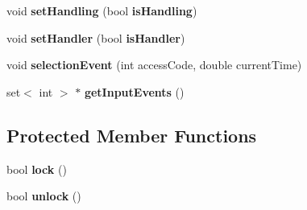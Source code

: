 \begin{CompactItemize}
\item 
void \textbf{setHandling} (bool {\bf isHandling})\label{classbr_1_1pucrio_1_1telemidia_1_1ginga_1_1ncl_1_1model_1_1components_1_1ExecutionObject_3fcfe4cd0c6be080a257bca297055e7c}

\item 
void \textbf{setHandler} (bool {\bf isHandler})\label{classbr_1_1pucrio_1_1telemidia_1_1ginga_1_1ncl_1_1model_1_1components_1_1ExecutionObject_270bb2b23cd33c6c981766852f74d99e}

\item 
void \textbf{selectionEvent} (int accessCode, double currentTime)\label{classbr_1_1pucrio_1_1telemidia_1_1ginga_1_1ncl_1_1model_1_1components_1_1ExecutionObject_1c356204c04e76d466c496ee81d7a04c}

\item 
set$<$ int $>$ $\ast$ \textbf{getInputEvents} ()\label{classbr_1_1pucrio_1_1telemidia_1_1ginga_1_1ncl_1_1model_1_1components_1_1ExecutionObject_c7aa901acff93a4f2cacddfe80037a63}

\end{CompactItemize}
\subsection*{Protected Member Functions}
\begin{CompactItemize}
\item 
bool \textbf{lock} ()\label{classbr_1_1pucrio_1_1telemidia_1_1ginga_1_1ncl_1_1model_1_1components_1_1ExecutionObject_bde223cb8968835b7f8f060e505facc2}

\item 
bool \textbf{unlock} ()\label{classbr_1_1pucrio_1_1telemidia_1_1ginga_1_1ncl_1_1model_1_1components_1_1ExecutionObject_e399421ee39cae4df5ea44bd21e31254}

\end{CompactItemize}
